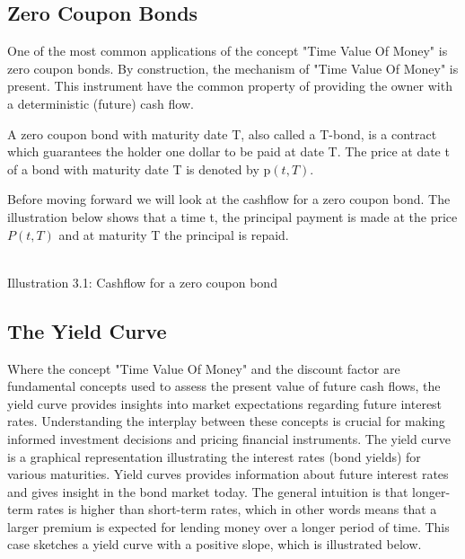 \subsection{Zero Coupon Bonds}
One of the most common applications of the concept "Time Value Of Money" is zero coupon bonds. 
By construction, the mechanism of "Time Value Of Money" is present. This instrument 
have the common property of providing the owner with a deterministic (future) cash flow. 
\begin{definition}\label{def:zcb}
    A zero coupon bond with maturity date T, also called a T-bond, is a contract which 
    guarantees the holder one dollar to be paid at date T. The price at date t of 
    a bond with maturity date T is denoted by p$(t,T)$. \cite{Bjork} 
\end{definition} 
\noindent
Before moving forward we will look at the cashflow for a zero coupon bond. The illustration below shows that a time t,
the principal payment is made at the price $P(t,T)$ and at maturity T the principal is repaid.
\begin{center}
    \\[10pt] 
    Illustration 3.1: Cashflow for a zero coupon bond
\end{center}

\subsection{The Yield Curve}
Where the concept "Time Value Of Money" and the discount factor are fundamental concepts used to assess the present value of future
cash flows, the yield curve provides insights into market expectations regarding future interest rates.
Understanding the interplay between these concepts is crucial for making informed investment decisions and pricing
financial instruments. The yield curve is a graphical representation illustrating the interest rates (bond yields) for various maturities.
Yield curves provides information about future interest rates and gives insight in the bond market today. 
The general intuition is that longer-term rates is higher than short-term rates, which in other words means that a
larger premium is expected for lending money over a longer period of time. This case sketches a yield curve with a 
positive slope, which is illustrated below.

